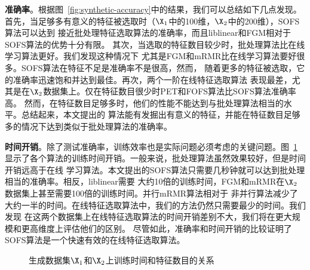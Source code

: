 \textbf{准确率}。根据图~\ref{fig:synthetic-accuracy}中的结果，我们可以总结如下几点发现。
首先，当足够多有意义的特征被选取时（$\X_1$中的100维，$\X_2$中的200维），SOFS算法可以达到
接近批处理特征选取算法的准确率，而且liblinear和FGM相对于SOFS算法的优势十分有限。
其次，当选取的特征数目较少时，批处理算法比在线学习算法更好。我们发现这种情况下
尤其是FGM和mRMR比在线学习算法要好很多。SOFS算法在特征不足是准确率不是很高，然而，
随着更多的特征被选取，它的准确率迅速饱和并达到最佳。再次，两个一阶在线特征选取算法
表现最差，尤其是在$\X_2$数据集上。仅在特征数目很少时PET和FOFS算法比SOFS算法准确率高。
然而，在特征数目足够多时，他们的性能不能达到与批处理算法相当的水平。总结起来，本文提出的
算法能有发掘出有意义的特征，并能在特征数目足够多的情况下达到类似于批处理算法的准确率。

\textbf{时间开销}。除了测试准确率，训练效率也是实际问题必须考虑的关键问题。图~\ref{fig:synthetic-time}
显示了各个算法的训练时间开销。一般来说，批处理算法虽然效果较好，但是时间开销远高于在线
学习算法。本文提出的SOFS算法只需要几秒钟就可以达到批处理相当的准确率。相反，liblinear需要
大约10倍的训练时间，FGM和mRMR在$\X_2$数据集上甚至需要100倍的训练时间。并行mRMR算法相对于
非并行算法减少了大约一半的时间。在线特征选取算法中，我们的方法仍然只需要最少的时间。我们发现
在这两个数据集上在线特征选取算法的时间开销差别不大，我们将在更大规模和更高维度上评估他们的区别。
尽管如此，准确率和时间开销的比较证明了SOFS算法是一个快速有效的在线特征选取算法。

\begin{figure}[t]
    \centerline{
    }
    \caption{生成数据集$\X_1$和$\X_2$上训练时间和特征数目的关系}
    \label{fig:synthetic-time}
\end{figure}

